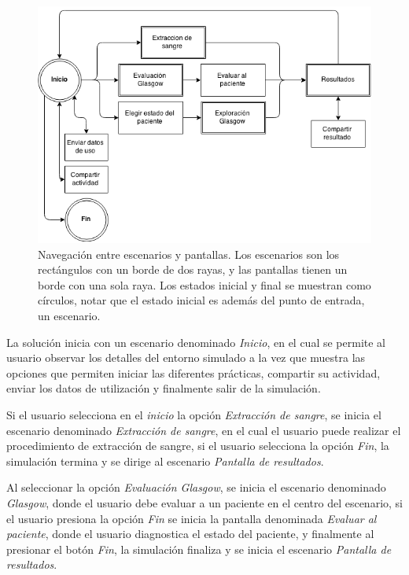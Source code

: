 \begin{figure}[H] 
\centering 
\includegraphics[scale=0.5]{propuesta/grafo_escenas.png}
\caption{Navegación entre escenarios y pantallas. Los escenarios son los
    rectángulos con un borde de dos rayas, y las pantallas tienen un borde con una
    sola raya. Los estados inicial y final se muestran como círculos, notar que
    el estado inicial es además del punto de entrada, un escenario.}
\label{fig:grafo_estados}
\end{figure}

La solución inicia con un escenario denominado \emph{Inicio}, en el cual se
permite al usuario observar los detalles del entorno simulado a la vez que
muestra las opciones que permiten iniciar las diferentes prácticas, compartir
su actividad, enviar los datos de utilización y finalmente salir de la
simulación.

Si el usuario selecciona en el \emph{inicio} la opción \emph{Extracción de
    sangre}, se inicia el escenario denominado \emph{Extracción de sangre}, en
el cual el usuario puede realizar el procedimiento de extracción de sangre, si
el usuario selecciona la opción \emph{Fin}, la simulación termina y se dirige 
al escenario \emph{Pantalla de resultados}.

Al seleccionar la opción \emph{Evaluación Glasgow}, se inicia el escenario
denominado \emph{Glasgow}, donde el usuario debe evaluar a un paciente en el
centro del escenario, si el usuario presiona la opción \emph{Fin} se inicia la
pantalla denominada \emph{Evaluar al paciente}, donde el usuario diagnostica el
estado del paciente, y finalmente al presionar el botón \emph{Fin}, la
simulación finaliza y se inicia el escenario \emph{Pantalla de resultados}.

